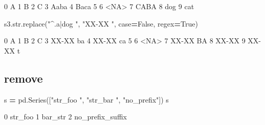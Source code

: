 \documentclass[
]{book}
\newenvironment{Shaded}{\begin{snugshade}}{\end{snugshade}}
\newcommand{\BuiltInTok}[1]{#1}
\newcommand{\NormalTok}[1]{#1}
\newcommand{\OperatorTok}[1]{\textcolor[rgb]{0.81,0.36,0.00}{\textbf{#1}}}
\newcommand{\StringTok}[1]{\textcolor[rgb]{0.31,0.60,0.02}{#1}}
\newcommand{\VariableTok}[1]{\textcolor[rgb]{0.00,0.00,0.00}{#1}}
\begin{document}
\begin{Shaded}
\begin{Highlighting}[]
\NormalTok{0       A}
\NormalTok{1       B}
\NormalTok{2       C}
\NormalTok{3    Aaba}
\NormalTok{4    Baca}
\NormalTok{5        }
\NormalTok{6    \textless{}NA\textgreater{}}
\NormalTok{7    CABA}
\NormalTok{8     dog}
\NormalTok{9     cat}
\end{Highlighting}
\end{Shaded}

\begin{Shaded}
\begin{Highlighting}[]
\NormalTok{s3.}\BuiltInTok{str}\NormalTok{.replace(}\StringTok{"\^{}.a|dog "}\NormalTok{, }\StringTok{"XX{-}XX "}\NormalTok{, case}\OperatorTok{=}\VariableTok{False}\NormalTok{, regex}\OperatorTok{=}\VariableTok{True}\NormalTok{)​}
\end{Highlighting}
\end{Shaded}

\begin{Shaded}
\begin{Highlighting}[]
\NormalTok{0           A}
\NormalTok{1           B}
\NormalTok{2           C}
\NormalTok{3    XX{-}XX ba}
\NormalTok{4    XX{-}XX ca}
\NormalTok{5            }
\NormalTok{6        \textless{}NA\textgreater{}}
\NormalTok{7    XX{-}XX BA}
\NormalTok{8      XX{-}XX }
\NormalTok{9     XX{-}XX t}
\end{Highlighting}
\end{Shaded}

\subsection{remove}\label{remove}

\begin{Shaded}
\begin{Highlighting}[]
\NormalTok{s }\OperatorTok{=}\NormalTok{ pd.Series([}\StringTok{"str\_foo "}\NormalTok{, }\StringTok{"str\_bar "}\NormalTok{, }\StringTok{"no\_prefix"}\NormalTok{])}
\NormalTok{s​}
\end{Highlighting}
\end{Shaded}

\begin{Shaded}
\begin{Highlighting}[]
\NormalTok{0             str\_foo}
\NormalTok{1             bar\_str}
\NormalTok{2    no\_prefix\_suffix}
\end{Highlighting}
\end{Shaded}
\end{document}
